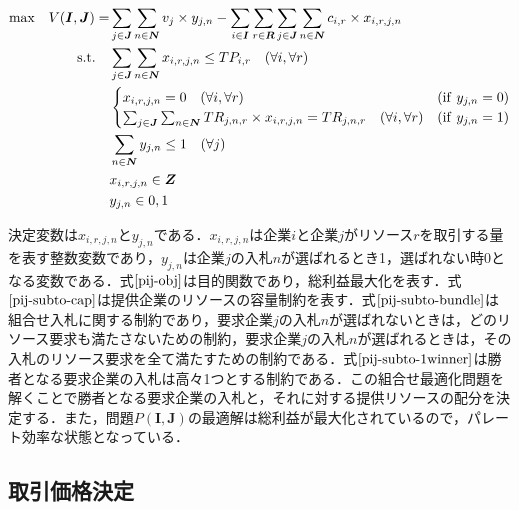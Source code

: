 \begin{align}
  {\rm max}\quad  V(\boldsymbol{I},\boldsymbol{J})=&\sum_{j\in \boldsymbol{J}}\sum_{n\in\boldsymbol{N}}v_{j} \times y_{j,n} - \sum_{i\in\boldsymbol{I}}\sum_{r\in\boldsymbol{R}}\sum_{j\in\boldsymbol{J}}\sum_{n\in\boldsymbol{N}}c_{i,r} \times x_{i,r,j,n} \label{pij-obj}\\
    {\rm s.t.} \quad &\sum_{j\in \boldsymbol{J}}\sum_{n\in\boldsymbol{N}}x_{i,r,j,n} \leq TP_{i,r} \quad (\forall i, \forall r) \label{pij-subto-cap}\\
  &\begin{cases}
    x_{i,r,j,n} = 0 \quad (\forall i, \forall r)&({\rm if} \ y_{j,n}=0) \\
    \sum_{j \in \boldsymbol{J}}\sum_{n\in\boldsymbol{N}} TR_{j,n,r} \times x_{i,r,j,n} = TR_{j,n,r}
    \quad  (\forall i, \forall r)&({\rm if} \ y_{j,n}=1) 
  \end{cases}\label{pij-subto-bundle}\\
    &\sum_{n\in \boldsymbol{N}}y_{j,n}  \leq 1 \quad (\forall j) \label{pij-subto-1winner}\\
    &x_{i,r,j,n} \in \boldsymbol{Z}\label{pij-decision-x}\\
    &y_{j,n} \in {0,1} \label{pij-decision-y}
\end{align}

決定変数は\(x_{i,r,j,n}\)と\(y_{j,n}\)である．\(x_{i,r,j,n}\)は企業\(i\)と企業\(j\)がリソース\(r\)を取引する量を表す整数変数であり，\(y_{j,n}\)は企業\(j\)の入札\(n\)が選ばれるとき1，選ばれない時0となる変数である．式\(\eqref{pij-obj}\)は目的関数であり，総利益最大化を表す．式\(\eqref{pij-subto-cap}\)は提供企業のリソースの容量制約を表す．式\(\eqref{pij-subto-bundle}\)は組合せ入札に関する制約であり，要求企業\(j\)の入札\(n\)が選ばれないときは，どのリソース要求も満たさないための制約，要求企業\(j\)の入札\(n\)が選ばれるときは，その入札のリソース要求を全て満たすための制約である．式\(\eqref{pij-subto-1winner}\)は勝者となる要求企業の入札は高々1つとする制約である．この組合せ最適化問題を解くことで勝者となる要求企業の入札と，それに対する提供リソースの配分を決定する．また，問題\(P(\boldsymbol{I},\boldsymbol{J})\)の最適解は総利益が最大化されているので，パレート効率な状態となっている．

\hypertarget{ux53d6ux5f15ux4fa1ux683cux6c7aux5b9a}{%
\subsection{取引価格決定}\label{ux53d6ux5f15ux4fa1ux683cux6c7aux5b9a}}

